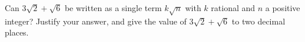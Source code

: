 Can $3\sqrt2+\sqrt6$ be written as a single term $k\sqrt n$ with $k$ rational and $n$ a positive integer? Justify your answer, and give the value of $3\sqrt2+\sqrt6$ to two decimal places.
